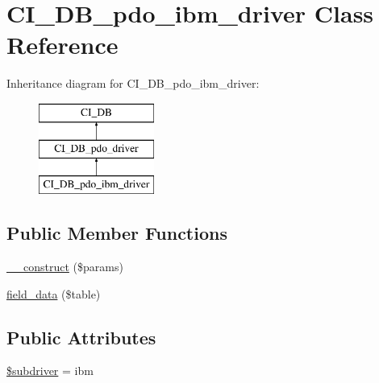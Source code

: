 \hypertarget{class_c_i___d_b__pdo__ibm__driver}{}\section{C\+I\+\_\+\+D\+B\+\_\+pdo\+\_\+ibm\+\_\+driver Class Reference}
\label{class_c_i___d_b__pdo__ibm__driver}
Inheritance diagram for C\+I\+\_\+\+D\+B\+\_\+pdo\+\_\+ibm\+\_\+driver\+:\begin{figure}[H]
\begin{center}
\leavevmode
\includegraphics[height=3.000000cm]{class_c_i___d_b__pdo__ibm__driver}
\end{center}
\end{figure}
\subsection*{Public Member Functions}
\begin{DoxyCompactItemize}
\item 
\mbox{\hyperlink{class_c_i___d_b__pdo__ibm__driver_a9162320adff1a1a4afd7f2372f753a3e}{\+\_\+\+\_\+construct}} (\$params)
\item 
\mbox{\hyperlink{class_c_i___d_b__pdo__ibm__driver_a90355121e1ed009e0efdbd544ab56efa}{field\+\_\+data}} (\$table)
\end{DoxyCompactItemize}
\subsection*{Public Attributes}
\begin{DoxyCompactItemize}
\item 
\mbox{\hyperlink{class_c_i___d_b__pdo__ibm__driver_a1322ca756348b11d080cb7a4f590de15}{\$subdriver}} = \textquotesingle{}ibm\textquotesingle{}
\end{DoxyCompactItemize}

